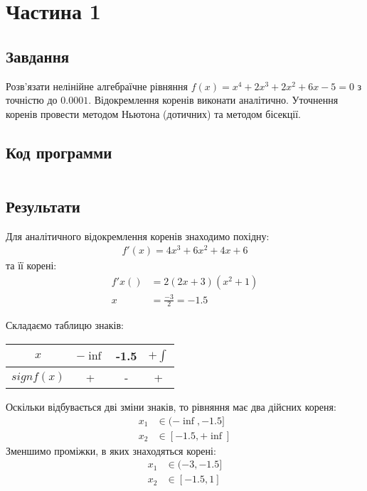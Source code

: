 \section{Частина 1}
\label{sec:task1}

\subsection{Завдання}
\label{subsec:task1_task}

Розв'язати нелінійне алгебраїчне рівняння
$f(x) = x^4 + 2x^3 + 2x^2 + 6x -5 = 0$ з точністю до $0.0001$.
Відокремлення коренів виконати аналітично.
Уточнення коренів провести методом Ньютона (дотичних)
та методом бісекції.

\subsection{Код программи}
\label{subsec:task1_code}
\inputminted{python}{../src/task1.py}

\subsection{Результати}
\label{subsec:task1_results}

Для аналітичного відокремлення коренів знаходимо похідну:
\begin{align}
    f'(x) = 4x^3 + 6x^2 + 4x + 6
\end{align}
та її корені:
\begin{align}
    f'x() & = 2 (2x + 3) (x^2 + 1) \\
    x     & = \frac{-3}{2} = -1.5
\end{align}

Складаємо таблицю знаків: \\
\begin{tabular}{|c|c|c|c|}
    \toprule
    $x$         & $-\inf$ & -1.5 & $+\int$ \\

    \midrule
    $sign f(x)$ & +       & -    & +       \\

    \bottomrule
\end{tabular}

Оскільки відбувається дві зміни знаків,
то рівняння має два дійсних кореня:
\begin{align}
    x_1 & \in (-\inf, -1.5] \\
    x_2 & \in [-1.5, +\inf]
\end{align}
Зменшимо проміжки, в яких знаходяться корені:
\begin{align}
    x_1 & \in (-3, -1.5] \\
    x_2 & \in [-1.5, 1]
\end{align}



